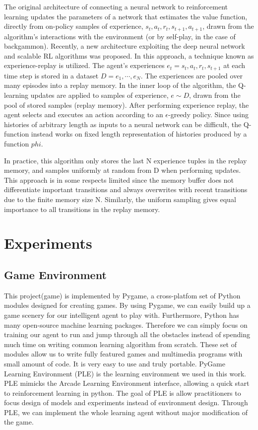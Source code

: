 \documentclass{acmsiggraph}
\begin{document}
The original architecture of connecting a neural network to reinforcement learning updates the parameters of a network that estimates the value function, directly from on-policy samples of experience, $s_t, a_t, r_t, s_{t+1}, a_{t+1}$, drawn from the algorithm’s interactions with the environment (or by self-play, in the case of backgammon). Recently, a new architecture exploiting the deep neural network and scalable RL algorithms was proposed. In this approach, a technique known as experience-replay is utilized. The agent's experiences $e_t={s_t, a_t, r_t, s_{t+1}}$ at each time step is stored in a dataset $D={e_1, \cdots, e_N}$. The experiences are pooled over many episodes into a replay memory. In the inner loop of the algorithm, the Q-learning updates are applied to samples of experience, $e \sim D$, drawn from the pool of stored samples (replay memory). After performing experience replay,
the agent selects and executes an action according to an $\epsilon$-greedy policy. Since using histories of arbitrary length as inputs to a neural network can be difficult, the Q-function instead works on fixed length representation of histories produced by a function $phi$. 

In practice, this algorithm only stores the last N experience tuples in the replay memory, and samples uniformly at random from D when performing updates. This approach is in some respects limited since the memory buffer does not differentiate important transitions and always overwrites with recent transitions due to the finite memory size N. Similarly, the uniform sampling gives equal importance to all transitions in the replay memory. 


\section{Experiments}
\subsection{Game Environment} 
This project(game) is implemented by Pygame, a cross-platfom set of Python modules designed for creating games. By using Pygame, we can easily build up a game scenery for our intelligent agent to play with. Furthermore, Python has many open-source machine learning packages. Therefore we can simply focus on training our agent to run and jump through all the obstacles instead of spending much time on writing common learning algorithm from scratch. These set of modules allow us to write fully featured games and multimedia programs with small amount of code. It is very easy to use and truly portable. PyGame Learning Environment (PLE) is the learning environment we used in this work. PLE mimicks the Arcade Learning Environment \cite{bellemare13arcade} interface, allowing a quick start to reinforcement learning in python. The goal of PLE is allow practitioners to focus design of models and experiments instead of environment design. Through PLE, we can implement the whole learning agent without major modification of the game.
\end{document}
